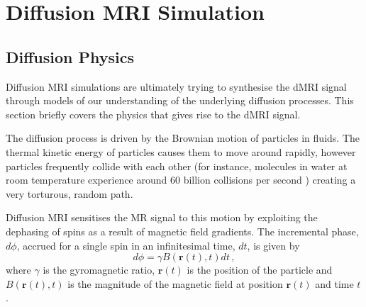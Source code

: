 \section{Diffusion MRI Simulation}
\label{sec:bg_diffusion_simulation}


\subsection{Diffusion Physics}
\label{sec:diffusion_physics}

Diffusion \ac{MRI} simulations are ultimately trying to synthesise the \ac{dMRI} signal through models of our understanding of the underlying diffusion processes.
This section briefly covers the physics that gives rise to the \ac{dMRI} signal. 

The diffusion process is driven by the Brownian motion of particles in fluids.
The thermal kinetic energy of particles causes them to move around rapidly, however particles frequently collide with each other (for instance, molecules in water at room temperature experience around 60 billion collisions per second \cite{Denny1993}) creating a very torturous, random path.

Diffusion \ac{MRI} sensitises the MR signal to this motion by exploiting the dephasing of spins as a result of magnetic field gradients.
The incremental phase, $d\phi$, accrued for a single spin in an infinitesimal time, $dt$, %
is given by
\begin{equation}
  d\phi = \gamma B(\mathbf{r}(t), t) dt\,,
  \label{eq:dphi}
\end{equation}
where $\gamma$ is the gyromagnetic ratio,  $\mathbf{r}(t)$ is the position of the particle and $B(\mathbf{r}(t), t)$ is the magnitude of the magnetic field at position $\mathbf{r}(t)$ and time $t$.


